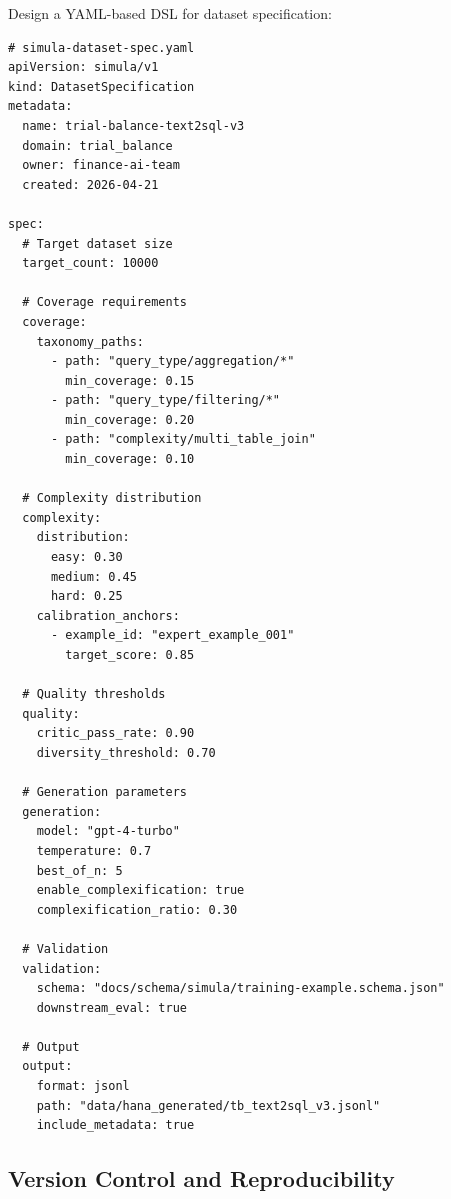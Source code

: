 Design a YAML-based DSL for dataset specification:

\begin{lstlisting}[language=yamlx,caption={Simula dataset specification DSL.}]
# simula-dataset-spec.yaml
apiVersion: simula/v1
kind: DatasetSpecification
metadata:
  name: trial-balance-text2sql-v3
  domain: trial_balance
  owner: finance-ai-team
  created: 2026-04-21
  
spec:
  # Target dataset size
  target_count: 10000
  
  # Coverage requirements
  coverage:
    taxonomy_paths:
      - path: "query_type/aggregation/*"
        min_coverage: 0.15
      - path: "query_type/filtering/*"
        min_coverage: 0.20
      - path: "complexity/multi_table_join"
        min_coverage: 0.10
    
  # Complexity distribution
  complexity:
    distribution:
      easy: 0.30
      medium: 0.45
      hard: 0.25
    calibration_anchors:
      - example_id: "expert_example_001"
        target_score: 0.85
  
  # Quality thresholds
  quality:
    critic_pass_rate: 0.90
    diversity_threshold: 0.70
    
  # Generation parameters
  generation:
    model: "gpt-4-turbo"
    temperature: 0.7
    best_of_n: 5
    enable_complexification: true
    complexification_ratio: 0.30
    
  # Validation
  validation:
    schema: "docs/schema/simula/training-example.schema.json"
    downstream_eval: true
    
  # Output
  output:
    format: jsonl
    path: "data/hana_generated/tb_text2sql_v3.jsonl"
    include_metadata: true
\end{lstlisting}

\subsection{Version Control and Reproducibility}

